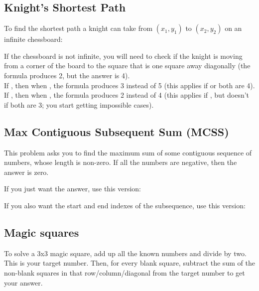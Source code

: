 

\subsection*{Knight's Shortest Path}

To find the shortest path a knight can take from $(x_1, y_1)$ to $(x_2, y_2)$ on an infinite chessboard:



If the chessboard is not infinite, you will need to check if the knight is moving from a corner of the board to the square that is one square away diagonally (the formula produces 2, but the answer is 4). \\
If , then when , the formula produces 3 instead of 5 (this applies if  or both are 4). \\
If , then when , the formula produces 2 instead of 4 (this applies if , but doesn't if both are 3; you start getting impossible cases).


\subsection*{Max Contiguous Subsequent Sum (MCSS)}

This problem asks you to find the maximum sum of some contiguous sequence of numbers, whose length is non-zero. If all the numbers are negative, then the answer is zero.

If you just want the answer, use this version:



If you also want the start and end indexes of the subsequence, use this version:



\subsection*{Magic squares}

To solve a 3x3 magic square, add up all the known numbers and divide by two. This is your target number. Then, for every blank square, subtract the sum of the non-blank squares in that row/column/diagonal from the target number to get your answer.

